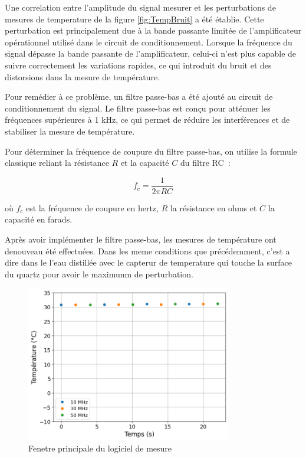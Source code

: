 Une correlation entre l'amplitude du signal mesurer et les perturbations de mesures de temperature de la  figure \ref{fig:TempBruit} a été établie.
Cette perturbation est principalement due à la bande passante limitée de l'amplificateur opérationnel utilisé dans le circuit de conditionnement. Lorsque la fréquence du signal dépasse la bande passante de l'amplificateur, celui-ci n'est plus capable de suivre correctement les variations rapides, ce qui introduit du bruit et des distorsions dans la mesure de température.

Pour remédier à ce problème, un filtre passe-bas a été ajouté au circuit de conditionnement du signal.
Le filtre passe-bas est conçu pour atténuer les fréquences supérieures à 1 kHz, ce qui permet de réduire les interférences et de stabiliser la mesure de température.

Pour déterminer la fréquence de coupure du filtre passe-bas, on utilise la formule classique reliant la résistance $R$ et la capacité $C$ du filtre RC :

\begin{equation}
f_c = \frac{1}{2\pi RC}
\label{eq:frequence_coupure}
\end{equation}

où $f_c$ est la fréquence de coupure en hertz, $R$ la résistance en ohms et $C$ la capacité en farads.

Après avoir implémenter le filtre passe-bas, les mesures de température ont denouveau été effectuées. Dans les meme conditions que précédemment, c'est a dire dans le l'eau distillée avec le capterur de temperature qui touche la surface du quartz pour avoir le maximunm de perturbation.

\begin{figure}[H]
    \centering
    \includegraphics[width=0.8\textwidth]{assets/figures/TempFiltered.png}
    \caption{Fenetre principale du logiciel de mesure}
    \label{fig:TempBruitFiltre}
\end{figure}


